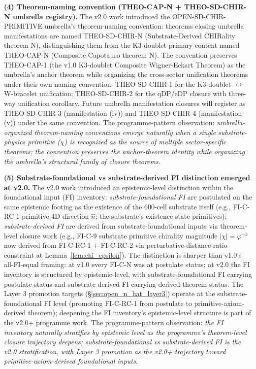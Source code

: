 \documentclass[11pt,letterpaper]{article}
\newcommand{\phig}{\varphi}
\begin{document}
\textbf{(4) Theorem-naming convention (THEO-CAP-N + THEO-SD-CHIR-N umbrella registry).} The v2.0 work introduced the OPEN-SD-CHIR-PRIMITIVE umbrella's theorem-naming convention: theorems closing umbrella manifestations are named THEO-SD-CHIR-N (Substrate-Derived CHIRality theorem N), distinguishing them from the K3-doublet primary content named THEO-CAP-N (Composite Capotauro theorem N). The convention preserves THEO-CAP-1 (the v1.0 K3-doublet Composite Wigner-Eckart Theorem) as the umbrella's anchor theorem while organizing the cross-sector unification theorems under their own naming convention: THEO-SD-CHIR-1 for the K3-doublet $\leftrightarrow$ W-bracelet unification; THEO-SD-CHIR-2 for the qDP/eDP closure with three-way unification corollary. Future umbrella manifestation closures will register as THEO-SD-CHIR-3 (manifestation (iv)) and THEO-SD-CHIR-4 (manifestation (v)) under the same convention. The programme-pattern observation: \emph{umbrella-organized theorem-naming conventions emerge naturally when a single substrate-physics primitive ($\chi$) is recognized as the source of multiple sector-specific theorems; the convention preserves the anchor-theorem identity while organizing the umbrella's structural family of closure theorems}.

\textbf{(5) Substrate-foundational vs substrate-derived FI distinction emerged at v2.0.} The v2.0 work introduced an epistemic-level distinction within the foundational input (FI) inventory: \emph{substrate-foundational FI} are postulated on the same epistemic footing as the existence of the 600-cell substrate itself (e.g., FI-C-RC-1 primitive 4D direction $\hat{n}$; the substrate's existence-state primitives); \emph{substrate-derived FI} are derived from substrate-foundational inputs via theorem-level closure work (e.g., FI-C-9 substrate primitive chirality magnitude $|\chi| = \phig^{-3}$ now derived from FI-C-RC-1 + FI-C-RC-2 via perturbative-distance-ratio constraint at Lemma~\ref{lem:chi_epsilon}). The distinction is sharper than v1.0's all-FI-equal framing: at v1.0 every FI-C-N was at postulate status; at v2.0 the FI inventory is structured by epistemic-level, with substrate-foundational FI carrying postulate status and substrate-derived FI carrying derived-theorem status. The Layer 3 promotion targets (\S\ref{sec:open_n_hat_layer3}) operate at the substrate-foundational FI level (promoting FI-C-RC-1 from postulate to primitive-axiom-derived theorem); deepening the FI inventory's epistemic-level structure is part of the v2.0+ programme work. The programme-pattern observation: \emph{the FI inventory naturally stratifies by epistemic level as the programme's theorem-level closure trajectory deepens; substrate-foundational vs substrate-derived FI is the v2.0 stratification, with Layer 3 promotion as the v2.0+ trajectory toward primitive-axiom-derived foundational inputs}.
\end{document}

